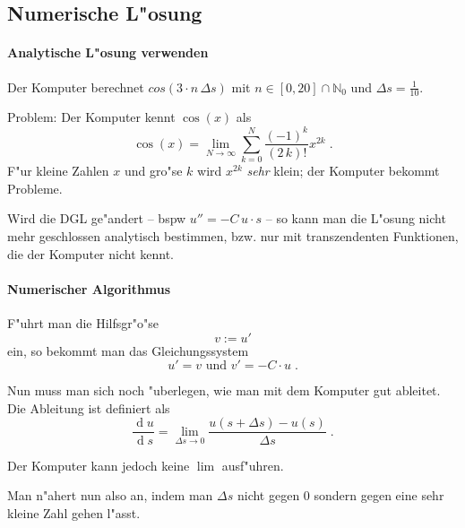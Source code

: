 \documentclass[a4paper]{book}
\newcommand{\diff}{\ensuremath{\operatorname d}}
\begin{document}
\subsection{Numerische L"osung}
\label{sec:numerische_losung}

\paragraph{Analytische L"osung verwenden}
\label{sec:analytische_losung_verwenden}

Der Komputer berechnet $cos(3 \cdot n \, \Delta s)$ mit $n \in [0,20]
\cap \mathbb N_0$ und $\Delta s = \frac{1}{10}$. 

Problem: Der Komputer kennt $\cos(x)$ als
\begin{equation}
  \label{eq:11}
  \cos(x) = \lim_{N \to \infty} \sum_{k = 0}^N
  \frac{(-1)^k}{(2\,k)!}x^{2k} \;.
\tag{1.21}
\end{equation}
F"ur kleine Zahlen $x$ und gro"se $k$ wird $x^{2k}$ \emph{sehr} klein;
der Komputer bekommt Probleme.

Wird die DGL ge"andert -- bspw $u'' = -C \, u \cdot s$ -- so kann man
die L"osung nicht mehr geschlossen analytisch bestimmen, bzw. nur mit
transzendenten Funktionen, die der Komputer nicht kennt.


\paragraph{Numerischer Algorithmus}
\label{sec:numerischer_algorithmus}

F"uhrt man die Hilfsgr"o"se 
\begin{equation}
  \label{eq:12}
  v := u'
\tag{1.22}
\end{equation}
ein, so bekommt man das Gleichungssystem
\begin{equation}
  \label{eq:13}
  u' = v \text{ und } v' = -C \cdot u \;.
\tag{1.23}
\end{equation}

Nun muss man sich noch "uberlegen, wie man mit dem Komputer gut
ableitet. Die Ableitung ist definiert als
\begin{equation}
  \label{eq:15}
  \frac{\diff u}{\diff s} = \lim_{\Delta s \to 0} \frac{u(s+\Delta  s)
    - u(s)}{\Delta s} \;.
\tag{1.24}
\end{equation}
\begin{Wichtig}
  Der Komputer kann jedoch keine $\lim$ ausf"uhren.
\end{Wichtig}
Man n"ahert nun also an, indem man $\Delta s$ nicht gegen $0$ sondern
gegen eine sehr kleine Zahl gehen l"asst.
\end{document}
